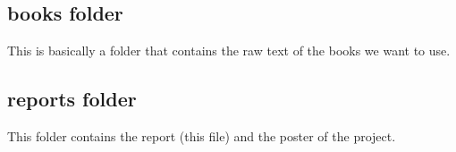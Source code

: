 \documentclass{article}
\begin{document}
\subsection{books folder}
This is basically a folder that contains the raw text of the books we want to use.
\subsection{reports folder}
This folder contains the report (this file) and the poster of the project.




\end{document}
